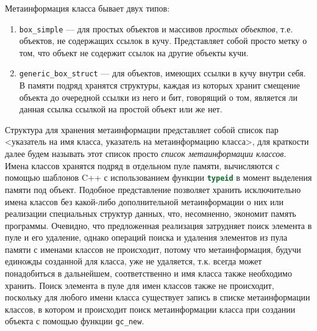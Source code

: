 Метаинформация класса бывает двух типов:
\begin{enumerate}
\item \lstinline[language= cpp]{box_simple} --- для простых объектов и массивов \textit{простых объектов},
	т.е. объектов, не содержащих ссылок в кучу. Представляет собой просто метку о том, что объект не содержит ссылок на другие
	объекты кучи.
\item \lstinline[language= cpp]{generic_box_struct} --- для объектов, имеющих ссылки в кучу внутри себя.
	В памяти подряд хранятся структуры, каждая из которых хранит смещение объекта до очередной ссылки из него и бит,
	говорящий о том, является ли данная ссылка ссылкой на простой объект или же нет.
\end{enumerate}
Структура для хранения метаинформации представляет собой список пар <указатель на имя класса, указатель на метаинформацию класса>,
для краткости далее будем называть этот список просто \textit{список метаинформации классов}.
Имена классов хранятся подряд в отдельном пуле памяти, вычисляются с помощью шаблонов C++ с использованием
функции \lstinline[language= cpp]{typeid} в момент выделения памяти под объект.
Подобное представление позволяет хранить исключительно имена классов без какой-либо дополнительной метаинформации о них
или реализации специальных структур данных, что, несомненно, экономит память программы.
Очевидно, что предложенная реализация затрудняет поиск элемента в пуле и его удаление, однако
операций поиска и удаления элементов из пула памяти с именами классов не происходит, потому что метаинформация,
будучи единожды созданной для класса, уже не удаляется, т.к. всегда может понадобиться в дальнейшем, соответственно
и имя класса также необходимо хранить. Поиск элемента в пуле для имен классов также не происходит,
поскольку для любого имени класса существует запись в списке метаинформации классов, в котором и происходит
поиск метаинформации класса при создании объекта с помощью функции \lstinline[language= cpp]{gc_new}.

